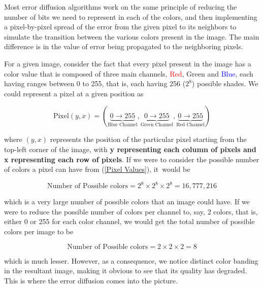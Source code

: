 \documentclass{article}
\begin{document}
Most error diffusion algorithms work on the same principle\cite{computerphile} of reducing the number of bits we need to represent in each of the colors, and then implementing a pixel-by-pixel spread of the error from the given pixel to its neighbors to simulate the transition between the various colors present in the image. The main difference is in the value of error being propagated to the neighboring pixels.

\medskip
\noindent For a given image, consider the fact that every pixel present in the image has a color value that is composed of three main channels, \textcolor{red}{Red}, \textcolor{Green4}{Green} and \textcolor{blue}{Blue}, each having ranges between 0 to 255, that is, each having 256 ($2^8$) possible shades. We could represent a pixel at a given position as

 \begin{equation} 
    \text{Pixel}(y,x) = (\underbrace{0\to255}_\text{Blue Channel},\underbrace{0\to255}_\text{Green Channel},\underbrace{0\to255}_\text{Red Channel})\label{Pixel Values}
 \end{equation}

\noindent where $(y,x)$ represents the position of the particular pixel starting from the top-left corner of the image, with \textbf{y representing each column of pixels and x representing each row of pixels}. If we were to consider the possible number of colors a pixel can have from (\ref{Pixel Values}), it\ would be

$$\text{Number of Possible colors} = 2^8\times2^8\times2^8 = 16,777,216$$

\noindent which is a very large number of possible colors that an image could have. If we were to reduce the possible number of colors per channel to, say, 2 colors, that is, either 0 or 255 for each color channel, we would get the total number of possible colors per image to be 

$$\text{Number of Possible colors} = 2\times2\times2 = 8$$

\noindent which is much lesser. However, as a consequence, we notice distinct color banding in the resultant image, making it obvious to see that its quality has degraded. This is where the error diffusion comes into the picture.

\medskip
\end{document}
